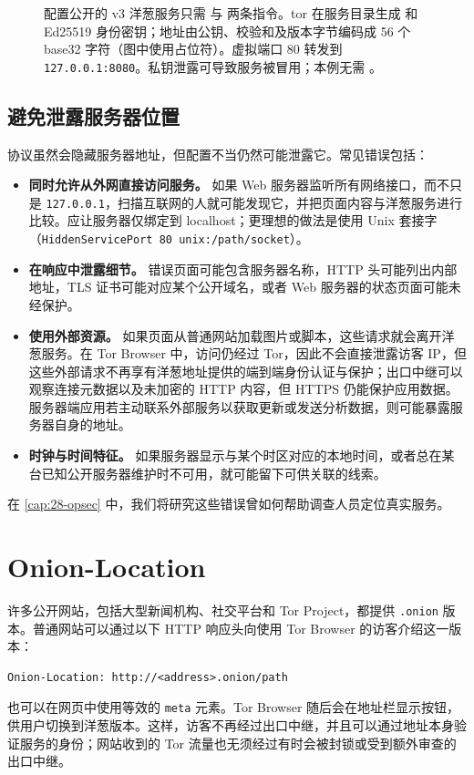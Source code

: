 \begin{figure}[htbp]
\centering

\caption{配置公开的 v3 洋葱服务只需  与  两条指令。tor 在服务目录生成  和 Ed25519 身份密钥；地址由公钥、校验和及版本字节编码成 56 个 base32 字符（图中使用占位符）。虚拟端口 80 转发到 \texttt{127.0.0.1:8080}。私钥泄露可导致服务被冒用；本例无需 。}
\label{fig:servizio}
\end{figure}

\subsection{避免泄露服务器位置}

协议虽然会隐藏服务器地址，但配置不当仍然可能泄露它。常见错误包括：
\begin{itemize}
  \item \textbf{同时允许从外网直接访问服务。} 如果 Web 服务器监听所有网络接口，而不只是 \texttt{127.0.0.1}，扫描互联网的人就可能发现它，并把页面内容与洋葱服务进行比较。应让服务器仅绑定到 localhost；更理想的做法是使用 Unix 套接字（\texttt{HiddenServicePort 80 unix:/path/socket}）。
  \item \textbf{在响应中泄露细节。} 错误页面可能包含服务器名称，HTTP 头可能列出内部地址，TLS 证书可能对应某个公开域名，或者 Web 服务器的状态页面可能未经保护。
  \item \textbf{使用外部资源。} 如果页面从普通网站加载图片或脚本，这些请求就会离开洋葱服务。在 Tor Browser 中，访问仍经过 Tor，因此不会直接泄露访客 IP，但这些外部请求不再享有洋葱地址提供的端到端身份认证与保护；出口中继可以观察连接元数据以及未加密的 HTTP 内容，但 HTTPS 仍能保护应用数据。服务器端应用若主动联系外部服务以获取更新或发送分析数据，则可能暴露服务器自身的地址。
  \item \textbf{时钟与时间特征。} 如果服务器显示与某个时区对应的本地时间，或者总在某台已知公开服务器维护时不可用，就可能留下可供关联的线索。
\end{itemize}
在 \cref{cap:28-opsec} 中，我们将研究这些错误曾如何帮助调查人员定位真实服务。

\section{Onion-Location}\label{sec:onionp-location}

许多公开网站，包括大型新闻机构、社交平台和 Tor Project，都提供 \texttt{.onion} 版本。普通网站可以通过以下 HTTP 响应头向使用 Tor Browser 的访客介绍这一版本：
\begin{lstlisting}[numbers=none]
Onion-Location: http://<address>.onion/path
\end{lstlisting}
也可以在网页中使用等效的 \texttt{meta} 元素。Tor Browser 随后会在地址栏显示按钮，供用户切换到洋葱版本。这样，访客不再经过出口中继，并且可以通过地址本身验证服务的身份；网站收到的 Tor 流量也无须经过有时会被封锁或受到额外审查的出口中继。

